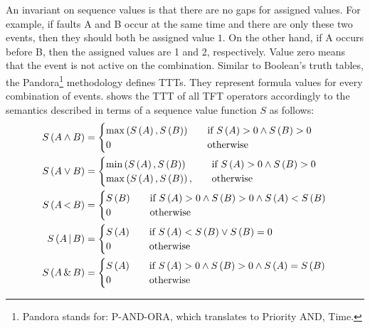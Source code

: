 \documentclass[12pt,openright,twoside,a4paper,oldfontcommands,english,brazil,final]{abntex2}
\theoremstyle{theo}
\def\pandora{Pandora\footnote{Pandora stands for: P-AND-ORA, which translates to Priority AND, Time.}%
  \gdef\pandora{Pandora\xspace}%
  \xspace}
\newcommand{\parsin}[1]{\ensuremath\left( #1 \right)}
\def\pand{\ensuremath\operatorname{<}}
\def\por{\ensuremath\operatorname{|}}
\def\sand{\ensuremath\operatorname{\&}}
\begin{document}
An invariant on sequence values is that there are no gaps for assigned values.
For example, if faults A and B occur at the same time and there are only these two events, then they should both be assigned value $1$.
On the other hand, if A occurs before B, then the assigned values are 1 and 2, respectively.
Value zero means that the event is not active on the combination.
Similar to Boolean's truth tables, the \pandora methodology defines \acp{TTT}.
They represent formula values for every combination of events.
 shows the \ac{TTT} of all \ac{TFT} operators accordingly to the semantics described in terms of a sequence value function $S$ as follows:
%
\begin{subequations}
  \begin{align}
    S\parsin{A \land B} &=
    \begin{cases}
      \max \parsin{S\parsin{A}, S\parsin{B}} &\quad \text{if }S \parsin{A} > 0 \land S \parsin{B} > 0\\
      0 &\quad\text{otherwise}\\
    \end{cases}\\
%
    S\parsin{A \lor B} &=
    \begin{cases}
      \min \parsin{S\parsin{A}, S\parsin{B}} &\quad \text{if }S \parsin{A} > 0 \land S \parsin{B} > 0\\
      \max \parsin{S\parsin{A}, S\parsin{B}}, &\quad\text{otherwise}\\
    \end{cases}\\
%
    S\parsin{A \pand B} &=
    \begin{cases}
      S\parsin{B} &\quad \text{if }S \parsin{A} > 0 \land S \parsin{B} > 0 \land S \parsin{A} < S \parsin{B}\\
      0 &\quad\text{otherwise}\\
    \end{cases}\\
%
    S\parsin{A \por B} &=
    \begin{cases}
      S\parsin{A} &\quad \text{if } S \parsin{A} < S \parsin{B} \lor S \parsin{B} = 0\\
      0 &\quad\text{otherwise}\\
    \end{cases}\\
%
    S\parsin{A \sand B} &=
    \begin{cases}
      S\parsin{A} &\quad \text{if }S \parsin{A} > 0 \land S \parsin{B} > 0 \land S \parsin{A} = S \parsin{B}\\
      0 &\quad\text{otherwise}\\
    \end{cases}
  \end{align}
\end{subequations}
\end{document}
